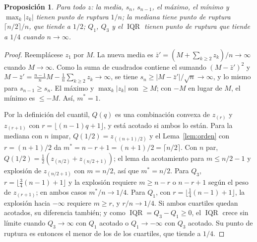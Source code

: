\documentclass[11pt,a4paper]{article}
\theoremstyle{plain}
\newtheorem{proposicion}[teorema]{Proposición}
\theoremstyle{definition}
\theoremstyle{remark}
\newcommand{\IQR}{\operatorname{IQR}}
\newcommand{\1}{\mathbf{1}}
\begin{document}
\begin{proposicion}\label{prop:ruptura}
Para todo $z$: la media, $s_n$, $s_{n-1}$, el máximo, el mínimo y
$\max_k|z_k|$ tienen punto de ruptura $1/n$; la mediana tiene punto de
ruptura $\lceil n/2\rceil/n$, que tiende a $1/2$; $Q_1$, $Q_3$ y el $\IQR$
tienen punto de ruptura que tiende a $1/4$ cuando $n\to\infty$.
\end{proposicion}

\begin{proof}
Reemplácese $z_1$ por $M$. La nueva media es
$\bar z'=(M+\sum_{k\ge2}z_k)/n\to\infty$ cuando $M\to\infty$. Como la
suma de cuadrados contiene el sumando $(M-\bar z')^2$ y
$M-\bar z'=\frac{n-1}nM-\frac1n\sum_{k\ge2}z_k\to\infty$, se tiene
$s_n\ge|M-\bar z'|/\sqrt n\to\infty$, y lo mismo para $s_{n-1}\ge s_n$.
El máximo y $\max_k|z_k|$ son $\ge M$; con $-M$ en lugar de $M$, el mínimo
es $\le-M$. Así, $m^*=1$.

Por la definición del cuantil, $Q(q)$ es una combinación convexa de
$z_{(r)}$ y $z_{(r+1)}$ con $r=\lfloor(n-1)q+1\rfloor$, y está acotado
si ambos lo están. Para la mediana con $n$ impar, $Q(1/2)=z_{((n+1)/2)}$ y
el Lema~\ref{lem:orden} con $r=(n+1)/2$ da $m^*=n-r+1=(n+1)/2=\lceil
n/2\rceil$. Con $n$ par, $Q(1/2)=\frac12(z_{(n/2)}+z_{(n/2+1)})$; el lema
da acotamiento para $m\le n/2-1$ y explosión de $z_{(n/2+1)}$ con
$m=n/2$, así que $m^*=n/2$. Para $Q_3$, $r=\lfloor\frac34(n-1)+1\rfloor$ y
la explosión requiere $m\ge n-r$ o $n-r+1$ según el peso de
$z_{(r+1)}$; en ambos casos $m^*/n\to1/4$. Para $Q_1$, con
$r=\lfloor\frac14(n-1)+1\rfloor$, la explosión hacia $-\infty$ requiere
$m\ge r$, y $r/n\to1/4$. Si ambos cuartiles quedan acotados, su
diferencia también; y como $\IQR=Q_3-Q_1\ge0$, el $\IQR$ crece sin límite
cuando $Q_3\to\infty$ con $Q_1$ acotado o $Q_1\to-\infty$ con $Q_3$
acotado. Su punto de ruptura es entonces el menor de los de los cuartiles,
que tiende a $1/4$.
\end{proof}
\end{document}

